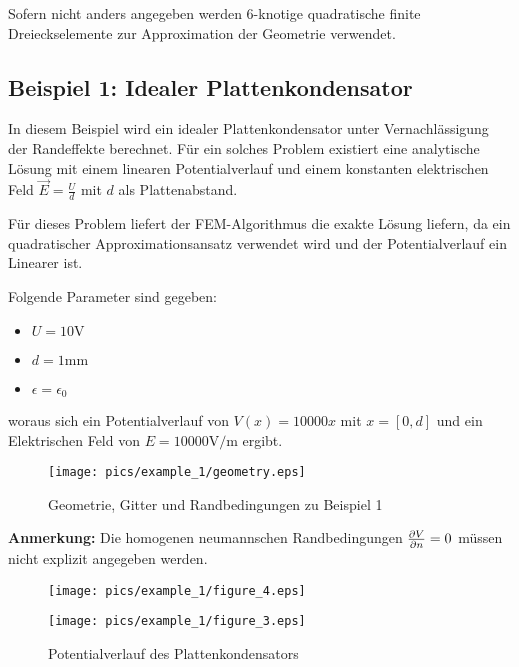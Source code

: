 Sofern nicht anders angegeben werden 6-knotige quadratische finite Dreieckselemente zur Approximation der Geometrie verwendet.

\subsection{Beispiel 1: Idealer Plattenkondensator}
In diesem Beispiel wird ein idealer Plattenkondensator unter Vernachlässigung der Randeffekte berechnet. Für ein solches Problem existiert eine analytische Lösung mit einem linearen Potentialverlauf und einem konstanten elektrischen Feld $\vec{E} = \frac{U}{d}$ mit $d$ als Plattenabstand.\newline

Für dieses Problem liefert der FEM-Algorithmus die exakte Lösung liefern, da ein quadratischer Approximationsansatz verwendet wird und der Potentialverlauf ein Linearer ist.



Folgende Parameter sind gegeben: 
\begin{itemize}
	\item $U = 10 \si{\volt}$
	\item $d = 1 \si{\milli\meter}$
	\item $\epsilon = \epsilon_0$
\end{itemize}

woraus sich ein Potentialverlauf von $V(x) = 10000x$ mit $x = [0,d]$ und ein Elektrischen Feld von $E = 10000 \si{\volt\per\meter}$ ergibt.

\begin{figure}[htbp]
	\centering
	\texttt{[image: pics/example\_1/geometry.eps]}
	\caption{Geometrie, Gitter und Randbedingungen zu Beispiel 1}
\end{figure}
\textbf{Anmerkung:} Die homogenen neumannschen Randbedingungen $\frac{\partial V}{\partial n} = 0$ müssen nicht explizit angegeben werden.


\begin{figure}[htbp]
	\begin{minipage}{0.5\textwidth}
		\texttt{[image: pics/example\_1/figure\_4.eps]}
	\end{minipage}
	\begin{minipage}{0.5\textwidth}
		\texttt{[image: pics/example\_1/figure\_3.eps]}
	\end{minipage}
\caption{Potentialverlauf des Plattenkondensators}
\label{fig:plate_cape_potential}
\end{figure}

